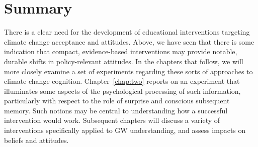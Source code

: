 \section{Summary}

There is a clear need for the development of educational interventions targeting
climate change acceptance and attitudes. Above, we have seen that there is some
indication that compact, evidence-based interventions may provide notable,
durable shifts in policy-relevant attitudes. In the chapters that follow, we
will more closely examine a set of experiments regarding these sorts of
approaches to climate change cognition. Chapter~\ref{chap:two} reports on an
experiment that illuminates some aspects of the psychological processing of such
information, particularly with respect to the role of surprise and conscious
subsequent memory. Such notions may be central to understanding how a successful
intervention would work. Subsequent chapters will discuss a variety of
interventions specifically applied to GW understanding, and assess impacts on
beliefs and attitudes.



